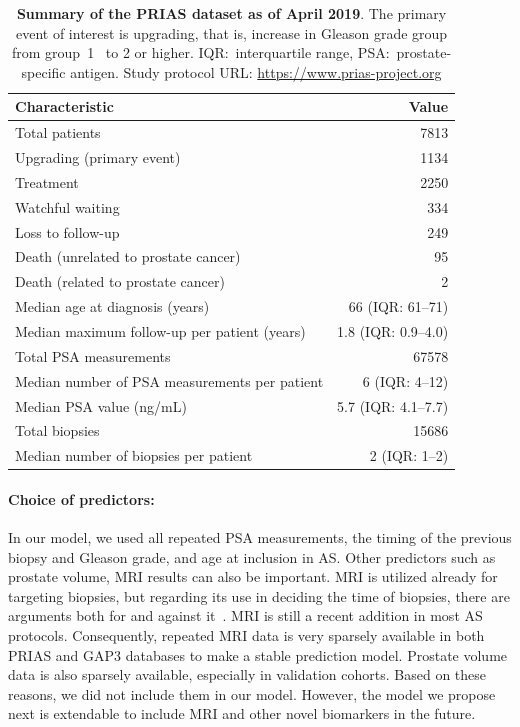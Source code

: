 \begin{table}
\small
\centering
\caption{\textbf{Summary of the PRIAS dataset as of April 2019}. The primary event of interest is upgrading, that is, increase in Gleason grade group from group~1~\citep{epsteinGG2014} to 2 or higher. IQR:~interquartile range, PSA:~prostate-specific antigen. Study protocol URL: \url{https://www.prias-project.org}}
\label{table:prias_summary}
\begin{tabular}{lr}
\toprule
\textbf{Characteristic} & \textbf{Value}\\
\midrule
Total patients & 7813\\
Upgrading (primary event) & 1134\\
Treatment & 2250\\
Watchful waiting & 334\\
Loss to follow-up & 249\\
Death (unrelated to prostate cancer) & 95\\
Death (related to prostate cancer) & 2\\
\midrule
Median age at diagnosis (years) & 66 (IQR: 61--71)\\
Median maximum follow-up per patient (years) &  1.8 (IQR: 0.9--4.0)\\
Total PSA measurements & 67578\\
Median number of PSA measurements per patient &  6 (IQR: 4--12)\\
Median PSA value (ng/mL) & 5.7 (IQR: 4.1--7.7)\\
Total biopsies & 15686\\
Median number of biopsies per patient &  2 (IQR: 1--2)\\
\bottomrule
\end{tabular}
\end{table}

\paragraph{Choice of predictors:} In our model, we used all repeated PSA measurements, the timing of the previous biopsy and Gleason grade, and age at inclusion in AS. Other predictors such as prostate volume, MRI results can also be important. MRI is utilized already for targeting biopsies, but regarding its use in deciding the time of biopsies, there are arguments both for and against it~\citep{kasivisvanathan2020magnetic,chesnut2019role,schoots2015magnetic}. MRI is still a recent addition in most AS protocols. Consequently, repeated MRI data is very sparsely available in both PRIAS and GAP3 databases to make a stable prediction model. Prostate volume data is also sparsely available, especially in validation cohorts. Based on these reasons, we did not include them in our model. However, the model we propose next is extendable to include MRI and other novel biomarkers in the future.

